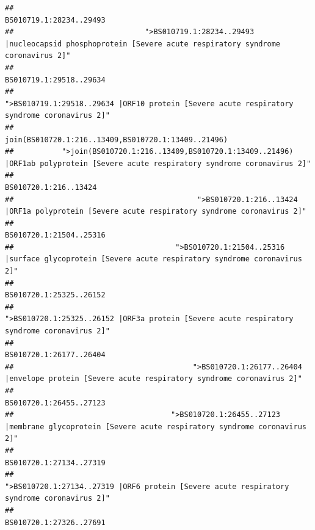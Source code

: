 \documentclass[
]{article}
\begin{document}
\begin{verbatim}
##                                                                                                                BS010719.1:28234..29493 
##                              ">BS010719.1:28234..29493 |nucleocapsid phosphoprotein [Severe acute respiratory syndrome coronavirus 2]" 
##                                                                                                                BS010719.1:29518..29634 
##                                            ">BS010719.1:29518..29634 |ORF10 protein [Severe acute respiratory syndrome coronavirus 2]" 
##                                                                                    join(BS010720.1:216..13409,BS010720.1:13409..21496) 
##           ">join(BS010720.1:216..13409,BS010720.1:13409..21496) |ORF1ab polyprotein [Severe acute respiratory syndrome coronavirus 2]" 
##                                                                                                                  BS010720.1:216..13424 
##                                          ">BS010720.1:216..13424 |ORF1a polyprotein [Severe acute respiratory syndrome coronavirus 2]" 
##                                                                                                                BS010720.1:21504..25316 
##                                     ">BS010720.1:21504..25316 |surface glycoprotein [Severe acute respiratory syndrome coronavirus 2]" 
##                                                                                                                BS010720.1:25325..26152 
##                                            ">BS010720.1:25325..26152 |ORF3a protein [Severe acute respiratory syndrome coronavirus 2]" 
##                                                                                                                BS010720.1:26177..26404 
##                                         ">BS010720.1:26177..26404 |envelope protein [Severe acute respiratory syndrome coronavirus 2]" 
##                                                                                                                BS010720.1:26455..27123 
##                                    ">BS010720.1:26455..27123 |membrane glycoprotein [Severe acute respiratory syndrome coronavirus 2]" 
##                                                                                                                BS010720.1:27134..27319 
##                                             ">BS010720.1:27134..27319 |ORF6 protein [Severe acute respiratory syndrome coronavirus 2]" 
##                                                                                                                BS010720.1:27326..27691 

\end{verbatim}
\end{document}
